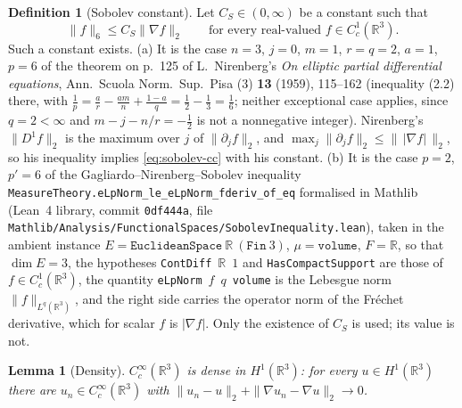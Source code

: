\documentclass[11pt]{article}
\newtheorem{lemma}[theorem]{Lemma}
\theoremstyle{definition}
\newtheorem{definition}[theorem]{Definition}
\theoremstyle{plain}
\newcommand{\R}{\mathbb R}
\begin{document}
\begin{definition}[Sobolev constant]\label{def:sobolev-constant}
Let $C_S\in(0,\infty)$ be a constant such that
\begin{equation}\label{eq:sobolev-cc}
 \|f\|_6\le C_S\|\nabla f\|_2
 \qquad\text{for every real-valued }f\in C_c^1(\R^3).
\end{equation}
Such a constant exists.  (a) It is the case $n=3$, $j=0$, $m=1$, $r=q=2$,
$a=1$, $p=6$ of the theorem on p.~125 of L.~Nirenberg's \emph{On elliptic
partial differential equations}, Ann.\ Scuola Norm.\ Sup.\ Pisa (3)
\textbf{13} (1959), 115--162 (inequality (2.2) there, with
$\tfrac1p=\tfrac ar-\tfrac{am}n+\tfrac{1-a}q=\tfrac12-\tfrac13=\tfrac16$;
neither exceptional case applies, since $q=2<\infty$ and
$m-j-n/r=-\tfrac12$ is not a nonnegative integer).  Nirenberg's
$\|D^1f\|_2$ is the maximum over $j$ of $\|\partial_jf\|_2$, and
$\max_j\|\partial_jf\|_2\le\|\,|\nabla f|\,\|_2$, so his inequality implies
\eqref{eq:sobolev-cc} with his constant.  (b) It is the case $p=2$,
$p'=6$ of the Gagliardo--Nirenberg--Sobolev inequality
\texttt{MeasureTheory.\allowbreak eLpNorm\_le\_\allowbreak eLpNorm\_fderiv\_of\_eq}
formalised in Mathlib (Lean~4 library, commit \texttt{0df444a}, file
\texttt{Mathlib/\allowbreak Analysis/\allowbreak FunctionalSpaces/\allowbreak SobolevInequality.lean}),
taken in the ambient instance $E=\texttt{EuclideanSpace}\ \R\ (\texttt{Fin}\ 3)$,
$\mu=\texttt{volume}$, $F=\R$, so that $\dim E=3$, the hypotheses
\texttt{ContDiff}\ $\R$\ $1$ and \texttt{HasCompactSupport} are those of
$f\in C_c^1(\R^3)$, the quantity \texttt{eLpNorm}\ $f$\ $q$\ \texttt{volume}
is the Lebesgue norm $\|f\|_{L^q(\R^3)}$, and the right side carries the
operator norm of the Fr\'echet derivative, which for scalar $f$ is
$|\nabla f|$.  Only the existence of $C_S$ is used; its value is not.
\end{definition}

\begin{lemma}[Density]\label{lem:h1-density}
$C_c^\infty(\R^3)$ is dense in $H^1(\R^3)$: for every $u\in H^1(\R^3)$ there
are $u_n\in C_c^\infty(\R^3)$ with $\|u_n-u\|_2+\|\nabla u_n-\nabla u\|_2\to0$.
\end{lemma}
\end{document}
